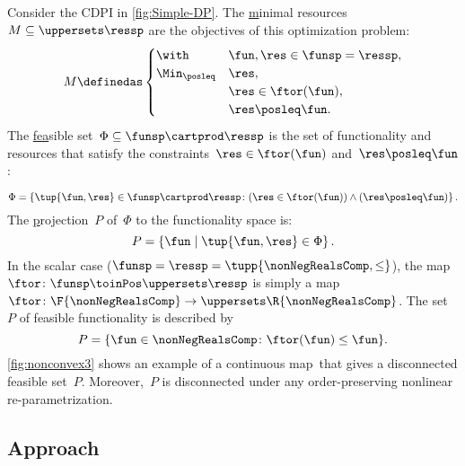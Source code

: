 \begin{example}
    \label{exa:one}
    Consider the CDPI in \cref{fig:Simple-DP}.
    The \uline{m}inimal resources~$M\subseteq\uppersets \ressp$ are the objectives of this optimization problem:
    \begin{equation*}
        M\definedas\begin{cases}
            \with          & \fun,\res\in\funsp=\ressp, \\
            \Min_{\posleq} & \res,                      \\
                           & \res\in\ftor(\fun),        \\
                           & \res\posleq\fun.
        \end{cases}
    \end{equation*}
    The \uline{fea}sible set~$\Phi\subseteq\funsp\cartprod\ressp$ is the set of functionality and resources that satisfy the constraints~$\res\in\ftor(\fun)$ and~$\res\posleq\fun$:

    \begin{equation}
        \Phi=\left\{ \tup{\fun,\res}\in\funsp\cartprod\ressp\colon (\res\in\ftor(\fun))\wedge(\res\posleq\fun)\right\} .\label{eq:feasible}
    \end{equation}
    The \uline{p}rojection~$P$ of~$\Phi$ to the functionality space is:
    \begin{equation*}
        P=\left\{ \fun\mid\tup{\fun,\res} \in\Phi\right\}.
    \end{equation*}
    In the scalar case ($\funsp=\ressp=\tupp{\nonNegRealsComp,\leq}$), the map~$\ftor\colon\funsp\toinPos\uppersets \ressp$ is simply a map~$\ftor\colon\F{\nonNegRealsComp}\to \uppersets\R{\nonNegRealsComp}$.
    The set~$P$ of feasible functionality is described by
    \begin{equation}
        P=\{\fun\in\nonNegRealsComp\colon \ftor(\fun)\leq\fun\}.\label{eq:Pfeasible}
    \end{equation}
    \cref{fig:nonconvex3} shows an example of a continuous map~\ftor that gives a disconnected feasible set~$P$.
    Moreover,~$P$ is disconnected under any order-preserving nonlinear re-parametrization.

\end{example}

\subsection{Approach}

